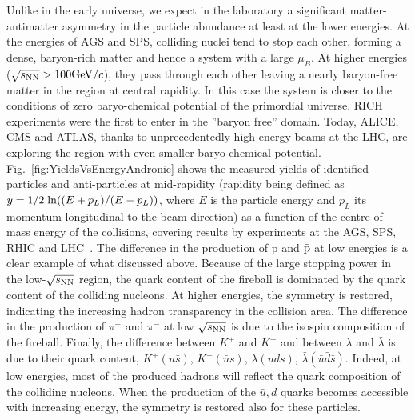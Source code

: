 Unlike in the early universe, we expect in the laboratory a significant matter-antimatter asymmetry in the particle abundance at least at the lower energies. 
At the energies of AGS and SPS, colliding nuclei tend to stop each other, forming a dense, baryon-rich matter and hence a system with a large $\mu_{B}$. At higher energies ($\sqrt{s_{\rm NN}} > 100 \mathrm{GeV}/c$), they pass through each other leaving a nearly baryon-free matter in the region at central rapidity. In this case the system is closer to the conditions of zero baryo-chemical potential of the primordial universe. RICH experiments were the first to enter in the ”baryon free” domain. Today, ALICE, CMS and ATLAS, thanks to unprecedentedly high energy beams at the LHC, are exploring the region with even smaller baryo-chemical potential. Fig.~\ref{fig:YieldsVsEnergyAndronic} shows the measured yields of identified particles and anti-particles at mid-rapidity (rapidity being defined as \mbox{$y = 1/2 \; {\rm ln}((E+p_{L})/(E-p_{L}))$}, where $E$ is the particle energy and $p_{L}$ its momentum longitudinal to the beam direction) as a function of the centre-of-mass energy of the collisions, covering results by experiments at the AGS, SPS, RHIC and LHC~\cite{Andronic:2014zha}. The difference in the production of p and $\bar{\rm p}$ at low energies is a clear example of what discussed above. Because of the large stopping power in the low-$\sqrt{s_{\rm NN}}$ region, the quark content of the fireball is dominated by the quark content of the colliding nucleons. At higher energies, the symmetry is restored, indicating the increasing hadron transparency in the collision area. 
The difference in the production of $\pi^+$ and $\pi^-$ at low $\sqrt{s_{\rm NN}}$ is due to the isospin composition of the fireball. Finally, the difference between $K^+$ and $K^-$ and between $\lambda$ and $\bar{\lambda}$ is due to their quark content, $K^+ (u\bar{s})$, $K^- (\bar{u}s)$, $\lambda (uds)$, $\bar{\lambda} (\bar
{u}\bar{d}\bar{s})$. Indeed, at low energies, most of the produced hadrons will reflect the quark composition of the colliding nucleons. When the production of the $\bar{u}, \bar{d}$ quarks becomes accessible with increasing energy, the symmetry is restored also for these particles.
